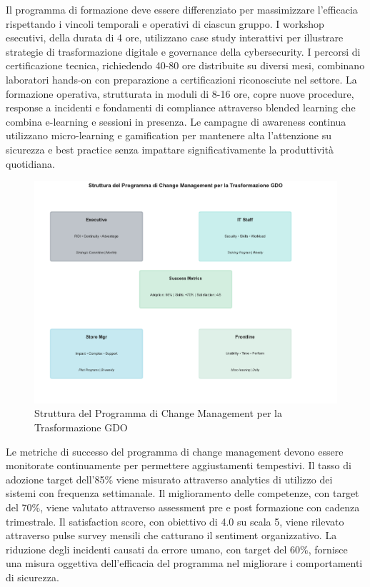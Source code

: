 Il programma di formazione deve essere differenziato per massimizzare l'efficacia rispettando i vincoli temporali e operativi di ciascun gruppo. I workshop esecutivi, della durata di 4 ore, utilizzano case study interattivi per illustrare strategie di trasformazione digitale e governance della cybersecurity. I percorsi di certificazione tecnica, richiedendo 40-80 ore distribuite su diversi mesi, combinano laboratori hands-on con preparazione a certificazioni riconosciute nel settore. La formazione operativa, strutturata in moduli di 8-16 ore, copre nuove procedure, response a incidenti e fondamenti di compliance attraverso blended learning che combina e-learning e sessioni in presenza. Le campagne di awareness continua utilizzano micro-learning e gamification per mantenere alta l'attenzione su sicurezza e best practice senza impattare significativamente la produttività quotidiana.

\begin{figure}[h!]
\centering
\includegraphics[width=1\textwidth]{thesis_figures/cap5/fig_5_3_change_mgmt.pdf}
\caption{Struttura del Programma di Change Management per la Trasformazione GDO}
\label{fig:change_management}
\end{figure}

Le metriche di successo del programma di change management devono essere monitorate continuamente per permettere aggiustamenti tempestivi. Il tasso di adozione target dell'85\% viene misurato attraverso analytics di utilizzo dei sistemi con frequenza settimanale. Il miglioramento delle competenze, con target del 70\%, viene valutato attraverso assessment pre e post formazione con cadenza trimestrale. Il satisfaction score, con obiettivo di 4.0 su scala 5, viene rilevato attraverso pulse survey mensili che catturano il sentiment organizzativo. La riduzione degli incidenti causati da errore umano, con target del 60\%, fornisce una misura oggettiva dell'efficacia del programma nel migliorare i comportamenti di sicurezza.

